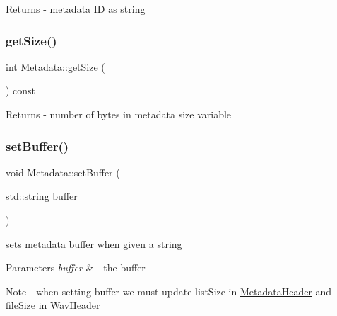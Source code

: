 \begin{DoxyReturn}{Returns}
-\/ metadata ID as string 
\end{DoxyReturn}
\mbox{\label{classMetadata_a358f06aba81e46be0f8deb7bb69b1f01}} 
\subsubsection{\texorpdfstring{get\+Size()}{getSize()}}
{\footnotesize\ttfamily int Metadata\+::get\+Size (\begin{DoxyParamCaption}{ }\end{DoxyParamCaption}) const}

\begin{DoxyReturn}{Returns}
-\/ number of bytes in metadata size variable 
\end{DoxyReturn}
\mbox{\label{classMetadata_ae117e7b7973744baeb0faac3db705ba0}} 
\subsubsection{\texorpdfstring{set\+Buffer()}{setBuffer()}}
{\footnotesize\ttfamily void Metadata\+::set\+Buffer (\begin{DoxyParamCaption}\item[{std\+::string}]{buffer }\end{DoxyParamCaption})}


\begin{DoxyItemize}
\item sets metadata buffer when given a string 
\begin{DoxyParams}{Parameters}
{\em buffer} & -\/ the buffer \\
\hline
\end{DoxyParams}
\begin{DoxyNote}{Note}
-\/ when setting buffer we must update list\+Size in \hyperlink{structMetadataHeader}{Metadata\+Header} and file\+Size in \hyperlink{structWavHeader}{Wav\+Header} 
\end{DoxyNote}

\end{DoxyItemize}\mbox{\label{classMetadata_a940cbd072f1b20e8f4c81806bad87f2c}} 
